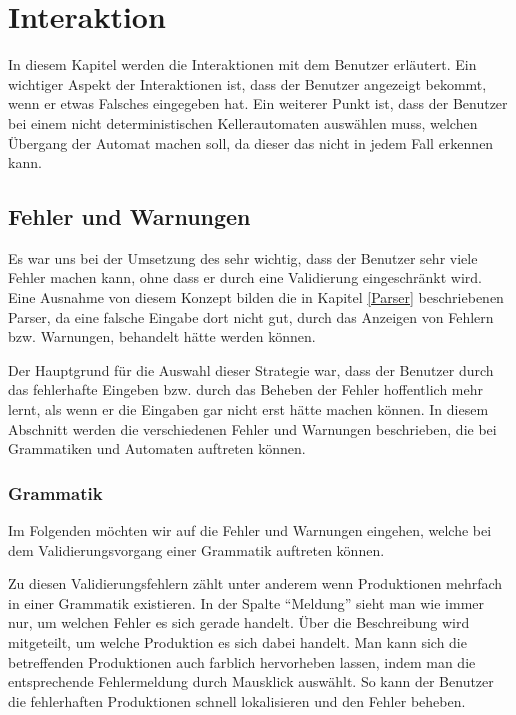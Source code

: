 

\chapter{Interaktion}\label{Interaction}

In diesem Kapitel werden die Interaktionen mit dem Benutzer erläutert. Ein
wichtiger Aspekt der Interaktionen ist, dass der Benutzer angezeigt bekommt,
wenn er etwas Falsches eingegeben hat. Ein weiterer Punkt ist, dass der Benutzer
bei einem nicht deterministischen Kellerautomaten auswählen muss, welchen
Übergang der Automat machen soll, da dieser das nicht in jedem Fall erkennen
kann.\vspace{10pt}


\section{Fehler und Warnungen}\label{InteractionErrorWarning}

Es war uns bei der Umsetzung des \gtitools sehr wichtig, dass der Benutzer sehr
viele Fehler machen kann, ohne dass er durch eine Validierung eingeschränkt wird.
Eine Ausnahme von diesem Konzept bilden die in Kapitel \ref{Parser} beschriebenen
Parser, da eine falsche Eingabe dort nicht gut, durch das Anzeigen von Fehlern
bzw. Warnungen, behandelt hätte werden können.\vspace{10pt}

Der Hauptgrund für die Auswahl dieser Strategie war, dass der Benutzer durch das
fehlerhafte Eingeben bzw. durch das Beheben der Fehler hoffentlich mehr lernt,
als wenn er die Eingaben gar nicht erst hätte machen können. In diesem Abschnitt
werden die verschiedenen Fehler und Warnungen beschrieben, die bei Grammatiken und
Automaten auftreten können.\vspace{10pt}


\subsection{Grammatik}\label{InteractionGrammar}

Im Folgenden möchten wir auf die Fehler und Warnungen eingehen, welche bei dem
Validierungsvorgang einer Grammatik auftreten können.\vspace{10pt}

Zu diesen Validierungsfehlern zählt unter anderem wenn Produktionen mehrfach
in einer Grammatik existieren. In der Spalte "`Meldung"' sieht man wie immer
nur, um welchen Fehler es sich gerade handelt. Über die Beschreibung wird
mitgeteilt, um welche Produktion es sich dabei handelt. Man kann sich die
betreffenden Produktionen auch farblich hervorheben lassen, indem man die
entsprechende Fehlermeldung durch Mausklick auswählt. So kann der Benutzer die
fehlerhaften Produktionen schnell lokalisieren und den Fehler beheben.\vspace{10pt}

